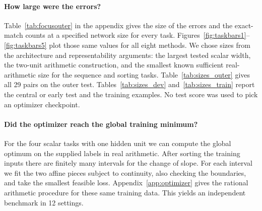 \paragraph{How large were the errors?}
Table~\ref{tab:focusouter} in the appendix gives the size of the errors and the exact-match counts at a specified network size for every task. Figures~\ref{fig:taskbars1}--\ref{fig:taskbars5} plot those same values for all eight methods. We chose sizes from the architecture and representability arguments: the largest tested scalar width, the two-unit arithmetic construction, and the smallest known sufficient real-arithmetic size for the sequence and sorting tasks. Table~\ref{tab:sizes_outer} gives all 29 pairs on the outer test. Tables~\ref{tab:sizes_dev} and~\ref{tab:sizes_train} report the central or early test and the training examples. No test score was used to pick an optimizer checkpoint.

\paragraph{Did the optimizer reach the global training minimum?}
For the four scalar tasks with one hidden unit we can compute the global optimum on the supplied labels in real arithmetic. After sorting the training inputs there are finitely many intervals for the change of slope. For each interval we fit the two affine pieces subject to continuity, also checking the boundaries, and take the smallest feasible loss. Appendix~\ref{app:optimizer} gives the rational arithmetic procedure for these same training data. This yields an independent benchmark in 12 settings. 
